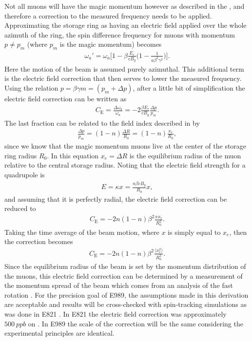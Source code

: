 Not all muons will have the magic momentum however as described in the , and therefore a correction to the measured \wa frequency needs to be applied. Approximating the storage ring as having an electric field applied over the whole azimuth of the ring, the spin difference frequency for muons with momentum $p \neq p_{m}$ (where $p_{m}$ is the magic momentum) becomes  
        \begin{align} \label{eq:waEfield}
            \omega_{a}' = \omega_{a} \Big[ 1 - \beta \frac{E_{r}}{c B_{y}} \Big( 1 - \frac{1}{a \beta^{2} \gamma^{2}} \Big) \Big].
        \end{align}
Here the motion of the beam is assumed purely azimuthal. This additional term is the electric field correction that then serves to lower the measured \wa frequency. Using the relation $p = \beta \gamma m = (p_{m} + \Delta p)$, after a little bit of simplification the electric field correction can be written as
        \begin{align}
            C_{\text{E}} = \frac{\Delta\omega_{a}}{\omega_{a}} = -2 \frac{\beta E_{r}}{c B_{y}} \frac{\Delta p}{p_{m}}.
        \end{align}
The last fraction can be related to the field index described in  by
        \begin{align}
            \frac{\Delta p}{p_{m}} = (1-n) \frac{\Delta R}{R_{0}} = (1-n) \frac{x_{e}}{R_{0}}, 
        \end{align}
since we know that the magic momentum muons live at the center of the storage ring radius $R_{0}$. In this equation $x_{e} = \Delta R$ is the equilibrium radius of the muon relative to the central storage radius. Noting that the electric field strength for a quadrupole is 
        \begin{align}
            E = \kappa x = \frac{n \beta c B_{y}}{R_{0}} x,
        \end{align}
and assuming that it is perfectly radial, the electric field correction can be reduced to 
        \begin{align}
            C_{\text{E}} = -2n (1-n) \beta^{2} \frac{x x_{e}}{R_{0}^{2}}.
        \end{align}
Taking the time average of the beam motion, where $x$ is simply equal to $x_{e}$, then the correction becomes
        \begin{align}
            C_{\text{E}} = -2n (1-n) \beta^{2} \frac{\langle x_{e}^{2} \rangle}{R_{0}^{2}}.
        \end{align}
Since the equilibrium radius of the beam is set by the momentum distribution of the muons, this electric field correction can be determined by a measurement of the momentum spread of the beam which comes from an analysis of the fast rotation \cite{fastrotation1,fastrotation2}. For the precision goal of E989, the assumptions made in this derivation are acceptable \cite{TDR} and results will be cross-checked with spin-tracking simulations as was done in E821 \cite{E821FinalReport}. In E821 the electric field correction was approximately $\SI{500}{ppb}$ on \wa \cite{E821FinalReport}. In E989 the scale of the correction will be the same considering the experimental principles are identical.


